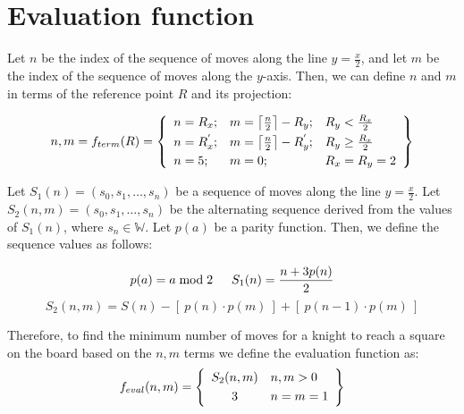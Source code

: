 \documentclass[a4paper, 12pt]{article}
\begin{document}
\section{Evaluation function}
Let \( n \) be the index of the sequence of moves along the line \( y = \frac{x}{2} \), and let \( m \) be the index of the 
sequence of moves along the \( y \)-axis. Then, we can define $n$ and $m$ in terms of the reference point \( R \) 
and its projection:

\vspace{1em}
\[
n,m = f_{term}(R) = \left\{
\begin{array}{l l l}
n = R_x; & m = \left\lceil \frac{n}{2} \right\rceil - R_y; & R_y < \frac{R_x}{2} \\[3pt]
n = R_x^{'}; & m = \left\lceil \frac{n}{2} \right\rceil - R_y^{'};& R_y \ge \frac{R_x}{2} \\[3pt]
n = 5; & m = 0; & R_x = R_y = 2
\end{array}
\right\}
\]

\vspace{1em}
\noindent Let \( S_1(n) = (s_0, s_1, \dots, s_n) \) be a sequence of moves along the line \( y = \frac{x}{2} \). 
Let \( S_2(n, m) = (s_0, s_1, \dots, s_n) \) be the alternating sequence derived from the values of \( S_1(n) \), 
where \( s_n \in \mathbb{W} \). Let \( p(a) \) be a parity function. Then, we define the sequence values as follows: 

\vspace{0.5em}
\[
p(a) = a \bmod 2 \hspace{1.5em}
S_1(n) = \dfrac{n + 3p(n)}{2}
\]
\vspace{0.5em}
\[
S_2(n,m) = S(n) - [ \ p(n) \cdot p(m) \ ] + [ \ p(n-1) \cdot p(m) \ ]
\]

\vspace{1em}
\noindent Therefore, to find the minimum number of moves for a knight to reach a square on the board based on the 
\(n, m \) terms we define the evaluation function as:
\vspace{0.8em}
\[
f_{eval}(n,m) = \left\{
\begin{array}{c l}
S_2(n,m) & n,m > 0 \\[3pt] 
3 & n = m = 1
\end{array}
\right\}
\]
\newpage

\end{document}

